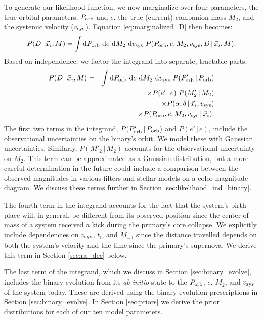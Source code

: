 \documentclass[usenatbib]{mnras}
\newcommand{\given}{\,|\,}
\newcommand{\dd}{\mathrm{d}}
\begin{document}
To generate our likelihood function, we now marginalize over four parameters, the true orbital parameters, $P_{\rm orb}$ and $e$, the true (current) companion mass $M_2$, and the systemic velocity ($v_{\rm sys}$). Equation \ref{eq:marginalized_D} then becomes:
\begin{equation}
P(D \given \vec{x}_i, M) =  \int \dd P_{\rm orb}\ \dd e\ \dd M_2\ \dd v_{\rm sys}\ P( P_{\rm orb}, e, M_2, v_{\rm sys}, D \given \vec{x}_i, M).
\end{equation}
Based on independence, we factor the integrand into separate, tractable parts:
\begin{eqnarray}
P(D \given \vec{x}_i, M) &=&  \int \dd P_{\rm orb}\ \dd e\ \dd M_2\ \dd v_{\rm sys}\ P(P'_{\rm orb} \given P_{\rm orb}) \nonumber \\
	& & \qquad \times P(e' \given e)\ P(M'_2 \given M_2) \nonumber \\
	& & \qquad \times P(\alpha, \delta \given \vec{x}_i, v_{\rm sys}) \nonumber \\
	& & \qquad \times P(P_{\rm orb}, e, M_2, v_{\rm sys} \given \vec{x}_i). \label{eq:marginalized}
\end{eqnarray}
The first two terms in the integrand, $P(P'_{\rm orb} \given P_{\rm orb})$ and $P(e' \given e)$, include the observational uncertainties on the binary's orbit. We model these with Gaussian uncertainties. Similarly, $P(M'_2 \given M_2)$ accounts for the observational uncertainty on $M_2$. This term can be approximated as a Gaussian distribution, but a more careful determination in the future could include a comparison between the observed magnitudes in various filters and stellar models on a color-magnitude diagram. We discuss these terms further in Section \ref{sec:likelihood_ind_binary}.

The fourth term in the integrand accounts for the fact that the system's birth place will, in general, be different from its observed position since the center of mass of a system received a kick during the primary's core collapse. We explicitly include dependencies on $v_{\rm sys}$, $t_i$, and $M_{1,i}$ since the distance travelled depends on both the system's velocity and the time since the primary's supernova. We derive this term in Section \ref{sec:ra_dec} below. 

The last term of the integrand, which we discuss in Section \ref{sec:binary_evolve}, includes the binary evolution from its {\it ab initio} state to the $P_{\rm orb}$, $e$, $M_2$, and $v_{\rm sys}$ of the system today. These are derived using the binary evolution prescriptions in Section \ref{sec:binary_evolve}. In Section \ref{sec:priors} we derive the prior distributions for each of our ten model parameters.
\end{document}
